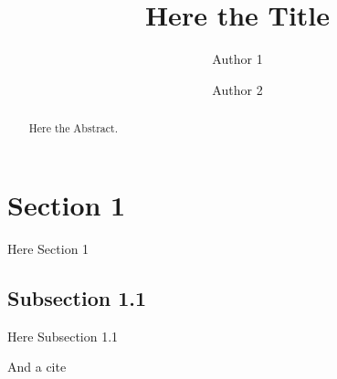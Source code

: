 \documentclass{mm}
\begin{document}
\begin{frontmatter}

\title{Here the Title} 

\author{Author 1}
\address{Affiliation 1\\
\texttt{xxx@xxx.xx}}

\author{Author 2}
\address{Affiliation 2\\
\texttt{xxx@xxx.xx}}


\begin{abstract}
Here the Abstract.
\end{abstract}
\end{frontmatter}


\section{Section 1}

Here Section 1

\subsection{Subsection 1.1}

Here Subsection 1.1

And a cite~\cite{gent:satp94}



\end{document}
